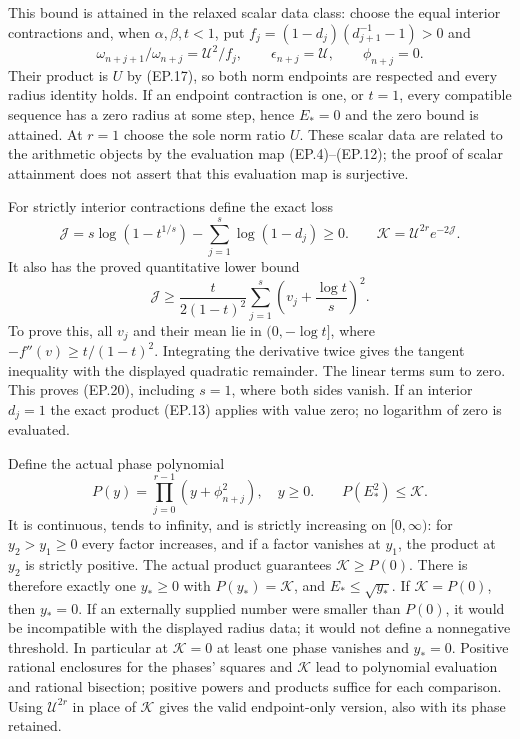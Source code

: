 \documentclass[11pt]{article}
\begin{document}
This bound is attained in the relaxed scalar data class: choose
the equal interior contractions and, when $\alpha,\beta,t<1$, put
$f_j=(1-d_j)(d_{j+1}^{-1}-1)>0$ and
\[
 \omega_{n+j+1}/\omega_{n+j}=\mathcal U^2/f_j,
 \qquad\epsilon_{n+j}=\mathcal U,\qquad\phi_{n+j}=0.
\tag{EP.18}
\]
Their product is $U$ by (EP.17), so both norm endpoints are respected
and every radius identity holds. If an endpoint contraction is one,
or $t=1$, every compatible sequence has a zero radius at some step,
hence $E_*=0$ and the zero bound is attained. At $r=1$ choose the
sole norm ratio $U$. These scalar data are related to the arithmetic
objects by the evaluation map (EP.4)--(EP.12); the proof of scalar
attainment does not assert that this evaluation map is surjective.

For strictly interior contractions define the exact loss
\[
 \mathcal J=s\log(1-t^{1/s})-\sum_{j=1}^s\log(1-d_j)\ge0.
 \qquad \mathcal K=\mathcal U^{2r}e^{-2\mathcal J}.
\tag{EP.19}
\]
It also has the proved quantitative lower bound
\[
 \mathcal J\ge\frac{t}{2(1-t)^2}
 \sum_{j=1}^s\left(v_j+\frac{\log t}{s}\right)^2.
\tag{EP.20}
\]
To prove this, all $v_j$ and their mean lie in $(0,-\log t]$,
where $-f''(v)\ge t/(1-t)^2$. Integrating the derivative twice
gives the tangent inequality with the displayed quadratic remainder.
The linear terms sum to zero. This proves (EP.20), including $s=1$,
where both sides vanish. If an interior $d_j=1$ the exact product
(EP.13) applies with value zero; no logarithm of zero is evaluated.

Define the actual phase polynomial
\[
 P(y)=\prod_{j=0}^{r-1}(y+\phi_{n+j}^2),\quad y\ge0.
 \qquad P(E_*^2)\le\mathcal K.\tag{EP.21}
\]
It is continuous, tends to infinity, and is strictly increasing on
$[0,\infty)$: for $y_2>y_1\ge0$ every factor increases, and if a
factor vanishes at $y_1$, the product at $y_2$ is strictly positive.
The actual product guarantees $\mathcal K\ge P(0)$. There is
therefore exactly one $y_*\ge0$ with $P(y_*)=\mathcal K$, and
$E_*\le\sqrt{y_*}$. If $\mathcal K=P(0)$, then $y_*=0$.
If an externally supplied number were smaller than $P(0)$, it would
be incompatible with the displayed radius data; it would not define
a nonnegative threshold. In particular at $\mathcal K=0$ at least
one phase vanishes and $y_*=0$. Positive rational enclosures for
the phases' squares and $\mathcal K$ lead to polynomial evaluation
and rational bisection; positive powers and products suffice for each
comparison. Using $\mathcal U^{2r}$ in place of $\mathcal K$
gives the valid endpoint-only version, also with its phase retained.
\end{document}

